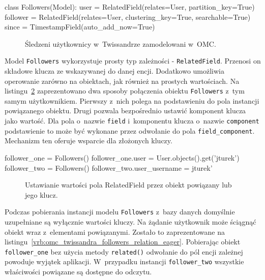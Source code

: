 \begin{verbbox}
	class Followers(Model):
	    user = RelatedField(relates=User, 
	                        partition_key=True)
	    follower = RelatedField(relates=User,
	                            clustering_key=True,
	                            searchable=True)
	    since = TimestampField(auto_add_now=True)
\end{verbbox}

\begin{figure}[ht!]
	\centering
	\theverbbox
	\caption{Śledzeni użytkownicy w~Twissandrze zamodelowani w~OMC.}
	\label{vrb:omc_twissandra_followers}
\end{figure}

Model \verb+Followers+ wykorzystuje prosty typ zależności - \verb+RelatedField+. Przenosi on składowe klucza ze wskazywanej do danej encji. Dodatkowo umożliwia operowanie zarówno na obiektach, jak również na prostych wartościach. Na listingu~\ref{vrb:omc_twissandra_followers_relation} zaprezentowano dwa sposoby połączenia obiektu \verb+Followers+ z~tym samym użytkownikiem. Pierwszy z~nich polega na podstawieniu do pola instancji powiązanego obiektu. Drugi pozwala bezpośrednio ustawić komponent klucza jako wartość. Dla pola o~nazwie \verb+field+ i~komponentu klucza o~nazwie \verb+component+ podstawienie to może być wykonane przez odwołanie do pola \verb+field_component+. Mechanizm ten oferuje wsparcie dla złożonych kluczy.

\begin{verbbox}
	follower_one = Followers()
	follower_one.user = User.objects().get('jturek')
	follower_two = Followers()
	follower_two.user_username = jturek'
\end{verbbox}

\begin{figure}[ht!]
	\centering
	\theverbbox
	\caption{Ustawianie wartości pola RelatedField przez obiekt powiązany lub jego klucz.}
	\label{vrb:omc_twissandra_followers_relation}
\end{figure}

Podczas pobierania instancji modelu \verb+Followers+ z~bazy danych domyślnie uzupełniane są wyłącznie wartości kluczy. Na żądanie użytkownik może ściągnąć obiekt wraz z~elementami powiązanymi. Zostało to zaprezentowane na listingu~\ref{vrb:omc_twissandra_followers_relation_eager}. Pobierając obiekt \verb+follower_one+ bez użycia metody \verb+related()+ odwołanie do pól encji zależnej powoduje wyjątek aplikacji. W~przypadku instancji \verb+follower_two+ wszystkie właściwości powiązane są dostępne do odczytu.

